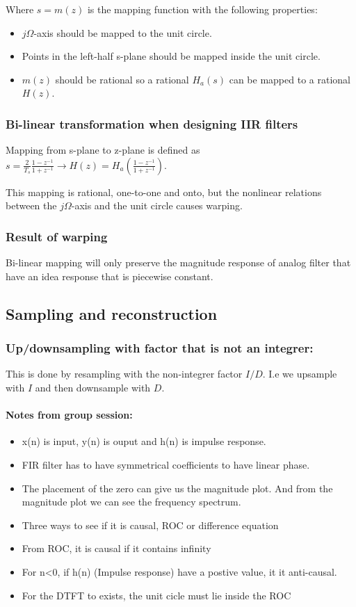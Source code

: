 \documentclass{article}
\begin{document}
Where $s=m(z)$ is the mapping function with the following properties:
\begin{itemize}
    \item $j\Omega$-axis should be mapped to the unit circle.
    \item Points in the left-half s-plane should be mapped inside the unit circle.
    \item $m(z)$ should be rational so a rational $H_a(s)$ can be mapped to a rational $H(z)$.
\end{itemize} 

\subsubsection{Bi-linear transformation when designing IIR filters}
Mapping from s-plane to z-plane is defined as $s = \frac{2}{T_s}\frac{1-z^{-1}}{1+z^{-1}} \rightarrow H(z)= H_a \left( \frac{1-z^{-1}}{1 + z^{-1}} \right)$.

This mapping is rational, one-to-one and onto, but the nonlinear relations between the $j\Omega$-axis and the unit circle causes warping.

\subsubsection{Result of warping}
Bi-linear mapping will only preserve the magnitude response of analog filter that have an idea response that is piecewise constant.

\subsection{Sampling and reconstruction}
\subsubsection{Up/downsampling with factor that is not an integrer:}
This is done by resampling with the non-integrer factor $I/D$. I.e we upsample with $I$ and then downsample with $D$. 


\paragraph{Notes from group session:}
\begin{itemize}
    \item x(n) is input, y(n) is ouput and h(n) is impulse response. 
    \item FIR filter has to have symmetrical coefficients to have linear phase.
    \item The placement of the zero can give us the magnitude plot. And from the magnitude plot we can see the frequency spectrum. 
    \item Three ways to see if it is causal, ROC or difference equation
    \item From ROC, it is causal if it contains infinity
    \item For n<0, if h(n) (Impulse response) have a postive value, it it anti-causal.
    \item For the DTFT to exists, the unit cicle must lie inside the ROC
\end{itemize}
\end{document}
